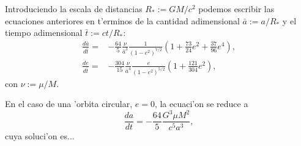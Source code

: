 Introduciendo la escala de distancias $R_\ast:=GM/c^2$ podemos escribir las ecuaciones anteriores en t'erminos de la cantidad adimensional $\bar{a}:=a/R_\ast$ y el tiempo adimensional $\bar{t}:=ct/R_\ast$:
\begin{align}
\frac{d\bar{a}}{d\bar{t}}=&-\frac{64}{5}\frac{\nu}{\bar{a}^3}\frac{1}{(1-e^2)^{7/2}}\left(1+\frac{73}{24}e^2+\frac{37}{96}e^4\right),\\
\frac{de}{d\bar{t}}=&-\frac{304}{15}\frac{\nu}{\bar{a}^4}\frac{e}{(1-e^2)^{5/2}}\left(1+\frac{121}{304}e^2\right),
\end{align}
con $\nu:=\mu/M$.

En el caso de una 'orbita circular, $e=0$, la ecuaci'on se reduce a
\begin{equation}
\frac{da}{dt} = -\frac{64}{5}\frac{G^3\mu M^2}{c^5a^3},
\end{equation}
cuya soluci'on es...


